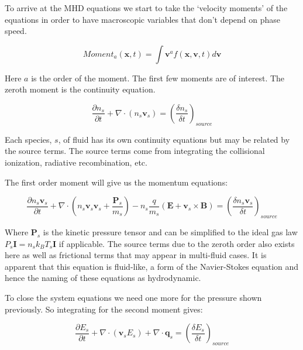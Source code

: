 \documentclass[12pt,upcase]{umlthesis}
\begin{document}
To arrive at the MHD equations we start to take the `velocity moments' of the equations in order to have macroscopic variables that don't depend on phase speed.

\begin{equation}
	{Moment}_a(\textbf{x}, t) = \int{\textbf{v}^a f(\textbf{x}, \textbf{v}, t)}d\textbf{v}
\end{equation}

Here $a$ is the order of the moment. The first few moments are of interest. The zeroth moment is the continuity equation.

\begin{equation}\label{eq:continuityequation}
	\frac{\partial n_s}{\partial t} + \nabla \cdot (n_s \textbf{v}_s) = {(\frac{\delta n_s}{\delta t})}_{source}
\end{equation}

Each species, $s$, of fluid has its own continuity equations but may be related by the source terms. The source terms come from integrating the collisional ionization, radiative recombination, etc.

The first order moment will give us the momentum equations:

\begin{equation}\label{eq:momentumequation}
	\frac{\partial n_s \textbf{v}_s}{\partial t} + \nabla \cdot (n_s \textbf{v}_s \textbf{v}_s + \frac{\textbf{P}_s}{m_s} ) -n_s \frac{q}{m_s}(\textbf{E} + \textbf{v}_s \times \textbf{B}) = {(\frac{\delta n_s \textbf{v}_s}{\delta t})}_{source}
\end{equation}

Where $\textbf{P}_s$ is the kinetic pressure tensor and can be simplified to the ideal gas law $P_s\textbf{I} = n_s k_B T_s \textbf{I}$ if applicable. The source terms due to the zeroth order also exists here as well as frictional terms that may appear in multi-fluid cases. It is apparent that this equation is fluid-like, a form of the Navier-Stokes equation and hence the naming of these equations as hydrodynamic.

To close the system equations we need one more for the pressure shown previously. So integrating for the second moment gives:

\begin{equation}\label{eq:energyequation}
	\frac{\partial E_s}{\partial t} + \nabla \cdot (\textbf{v}_s E_s) + \nabla \cdot \textbf{q}_s = {(\frac{\delta E_s}{\delta t})}_{source}
\end{equation}
\end{document}
